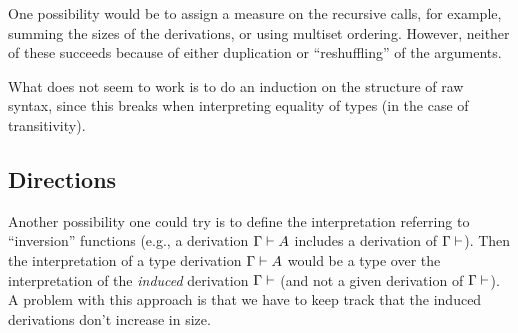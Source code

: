 \documentclass{amsart}
\theoremstyle{plain}
\theoremstyle{definition}
\theoremstyle{remark}
\begin{document}
One possibility would be to assign a measure on the recursive calls,
for example, summing the sizes of the derivations, or using multiset
ordering.  However, neither of these succeeds because of either
duplication or ``reshuffling'' of the arguments.

What does not seem to work is to do an induction on the structure of
raw syntax, since this breaks when interpreting equality of types (in
the case of transitivity).

\subsection{Directions}

Another possibility one could try is to define the interpretation
referring to ``inversion'' functions (e.g., a derivation $\Gamma \vdash
A$ includes a derivation of $\Gamma \vdash$).  Then the interpretation
of a type derivation $\Gamma \vdash A$ would be a type over the
interpretation of the \emph{induced} derivation $\Gamma \vdash$ (and not
a given derivation of $\Gamma \vdash$).  A problem with this approach is
that we have to keep track that the induced derivations don't increase
in size.
\end{document}

